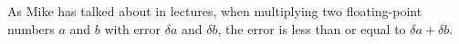 \documentclass[11pt,
				a4paper,
				article,
				oneside,
				oldfontcommands]{memoir}
\begin{document}
As Mike has talked about in lectures, when multiplying two floating-point numbers $a$ and $b$ with error $\delta a$ and $\delta b $, the error is less than or equal to $\delta a + \delta b$.

\end{document}
